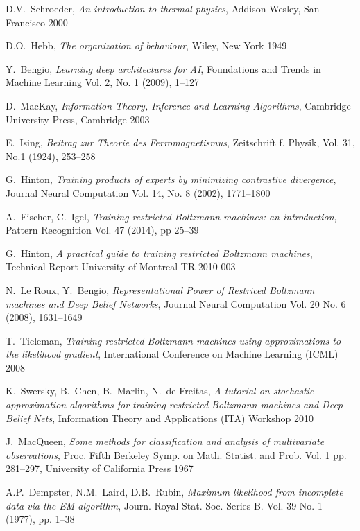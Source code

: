 \documentclass[a4paper, draft]{article}
\theoremstyle{own}
\theoremstyle{remark}
\begin{document}
\begin{thebibliography}{9}
D.V.~Schroeder,
{\em An introduction to thermal physics},
Addison-Wesley, San Francisco 2000

D.O.~Hebb,
{\em The organization of behaviour},
Wiley, New York 1949

Y.~Bengio,
{\em Learning deep architectures for AI},
Foundations and Trends in Machine Learning Vol. 2, No. 1 (2009), 1--127

D.~MacKay,
{\em Information Theory, Inference and Learning Algorithms},
Cambridge University Press, Cambridge 2003

E.~Ising,
{\em Beitrag zur Theorie des Ferromagnetismus},
Zeitschrift f. Physik, Vol. 31, No.1 (1924), 253--258

G.~Hinton,
{\em Training products of experts by minimizing contrastive divergence},
Journal Neural Computation Vol. 14, No. 8 (2002), 1771--1800

A.~Fischer, C.~Igel,
{\em Training restricted Boltzmann machines: an introduction},
Pattern Recognition Vol. 47 (2014), pp 25--39

G.~Hinton,
{\em A practical guide to training restricted Boltzmann machines},
Technical Report University of Montreal TR-2010-003

N.~Le Roux, Y.~Bengio,
{\em Representational Power of Restriced Boltzmann machines and Deep Belief Networks},
Journal Neural Computation Vol. 20 No. 6 (2008), 1631--1649

T.~Tieleman, 
{\em Training restricted Boltzmann machines using approximations to the likelihood gradient},
International Conference on Machine Learning (ICML) 2008

K.~Swersky, B.~Chen, B.~Marlin, N.~de Freitas,
{\em A tutorial on stochastic approximation algorithms for training restricted Boltzmann machines and Deep Belief Nets},
Information Theory and Applications (ITA) Workshop 2010

J.~MacQueen,
{\em Some methods for classification and analysis of multivariate observations},
Proc. Fifth Berkeley Symp. on Math. Statist. and Prob. Vol. 1 pp. 281--297,
University of California Press 1967

A.P.~Dempster, N.M.~Laird, D.B.~Rubin,
{\em Maximum likelihood from incomplete data via the EM-algorithm},
Journ. Royal Stat. Soc. Series B. Vol. 39 No. 1 (1977), pp. 1--38

\end{thebibliography}
\end{document}
